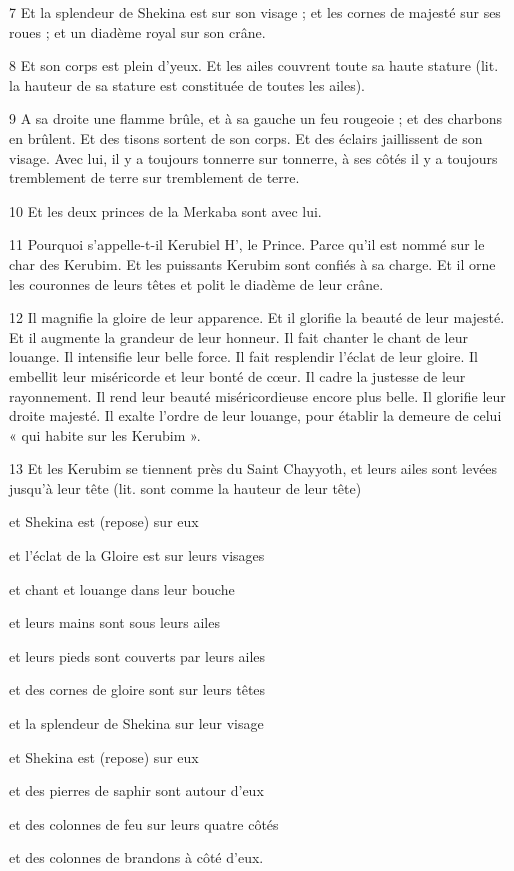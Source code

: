 \par 7 Et la splendeur de Shekina est sur son visage ; et les cornes de majesté sur ses roues ; et un diadème royal sur son crâne.

\par 8 Et son corps est plein d'yeux. Et les ailes couvrent toute sa haute stature (lit. la hauteur de sa stature est constituée de toutes les ailes).

\par 9 A sa droite une flamme brûle, et à sa gauche un feu rougeoie ; et des charbons en brûlent. Et des tisons sortent de son corps. Et des éclairs jaillissent de son visage. Avec lui, il y a toujours tonnerre sur tonnerre, à ses côtés il y a toujours tremblement de terre sur tremblement de terre.

\par 10 Et les deux princes de la Merkaba sont avec lui.

\par 11 Pourquoi s'appelle-t-il Kerubiel H', le Prince. Parce qu'il est nommé sur le char des Kerubim. Et les puissants Kerubim sont confiés à sa charge. Et il orne les couronnes de leurs têtes et polit le diadème de leur crâne.

\par 12 Il magnifie la gloire de leur apparence. Et il glorifie la beauté de leur majesté. Et il augmente la grandeur de leur honneur. Il fait chanter le chant de leur louange. Il intensifie leur belle force. Il fait resplendir l’éclat de leur gloire. Il embellit leur miséricorde et leur bonté de cœur. Il cadre la justesse de leur rayonnement. Il rend leur beauté miséricordieuse encore plus belle. Il glorifie leur droite majesté. Il exalte l'ordre de leur louange, pour établir la demeure de celui « qui habite sur les Kerubim ».

\par 13 Et les Kerubim se tiennent près du Saint Chayyoth, et leurs ailes sont levées jusqu'à leur tête (lit. sont comme la hauteur de leur tête)
\par et Shekina est (repose) sur eux
\par et l'éclat de la Gloire est sur leurs visages
\par et chant et louange dans leur bouche
\par et leurs mains sont sous leurs ailes
\par et leurs pieds sont couverts par leurs ailes
\par et des cornes de gloire sont sur leurs têtes
\par et la splendeur de Shekina sur leur visage
\par et Shekina est (repose) sur eux
\par et des pierres de saphir sont autour d'eux
\par et des colonnes de feu sur leurs quatre côtés
\par et des colonnes de brandons à côté d'eux.

